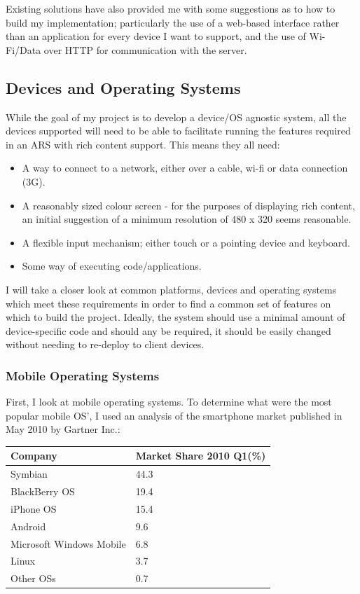 \documentclass[a4papert,11pt,notitlepage]{ltxdoc}
\begin{document}
Existing solutions have also provided me with some suggestions as to how to build my implementation; particularly the use of a web-based interface rather than an application for every device I want to support, and the use of Wi-Fi/Data over HTTP for communication with the server.

\subsection{Devices and Operating Systems}
\label{sec:devices}
While the goal of my project is to develop a device/OS agnostic system, all the devices supported will need to be able to facilitate running the features required in an ARS with rich content support. This means they all need:
\begin{itemize}
\item A way to connect to a network, either over a cable, wi-fi or data connection (3G).
\item A reasonably sized colour screen - for the purposes of displaying rich content, an initial suggestion of a minimum resolution of 480 x 320 seems reasonable.
\item A flexible input mechanism; either touch or a pointing device and keyboard.
\item Some way of executing code/applications.
\end{itemize}

I will take a closer look at common platforms, devices and operating systems which meet these requirements in order to find a common set of features on which to build the project. Ideally, the system should use a minimal amount of device-specific code and should any be required, it should be easily changed without needing to re-deploy to client devices.

\subsubsection{Mobile Operating Systems}
First, I look at mobile operating systems. To determine what were the most popular mobile OS', I used an analysis of the smartphone market published in May 2010 by Gartner Inc.\cite{gartner:mobile}:

\begin{tabular}{l l}
Company & Market Share 2010 Q1(\%) \\
\hline
Symbian & 44.3 \\
BlackBerry OS & 19.4 \\
iPhone OS & 15.4 \\
Android & 9.6 \\
Microsoft Windows Mobile & 6.8 \\
Linux & 3.7 \\
Other OSs & 0.7 \\
\end{tabular}
\end{document}
